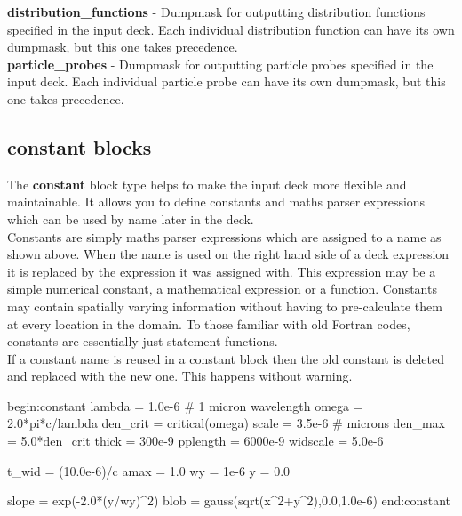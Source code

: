 \documentclass[12pt,a4paper]{article}
\newcommand{\emphtext}{\color{warwickdark} \fontfamily{phv}\selectfont\large\bf}
\newcommand{\inlineemph}[1]{{\color{warwicklight} \bf{#1}}}
\newenvironment{lboxverbatim}[1]{
\setlength{\FrameSep}{0pt}
\def\FrameCommand{\fboxsep=0pt \colorbox{shadecolor}}
\MakeFramed{\FrameRestore}
\vspace{-13.5pt}
\fvset{label=#1}
\boxverb
}{
\endboxverb
\vspace{-13.5pt}
\endMakeFramed
}
\begin{document}
{\emphtext distribution\_functions} - Dumpmask for outputting distribution
functions specified in the input deck. Each individual distribution function
can have its own dumpmask, but this one takes precedence.\\

{\emphtext particle\_probes} - Dumpmask for outputting particle probes
specified in the input deck. Each individual particle probe
can have its own dumpmask, but this one takes precedence.\\


\subsection{\inlineemph{constant} blocks}

The \inlineemph{constant} block type helps to make the input deck more flexible
and maintainable. It allows you to define constants and maths parser
expressions which can be used by name later in the deck.\\

Constants are simply maths parser expressions which are assigned to a name as
shown above. When the name is used on the right hand side of a deck expression
it is replaced by the expression it was assigned with. This expression may
be a simple numerical constant, a mathematical expression or a function.
Constants may contain spatially varying information without having to
pre-calculate them at every location in the domain.
To those familiar with old Fortran codes, constants are essentially just
statement functions.\\

If a constant name is reused in a constant block then the old constant is
deleted and replaced with the new one. This happens without warning.\\

\begin{lboxverbatim}{constant block}
begin:constant
   lambda = 1.0e-6 # 1 micron wavelength
   omega = 2.0*pi*c/lambda
   den_crit = critical(omega)
   scale = 3.5e-6 # microns
   den_max = 5.0*den_crit
   thick = 300e-9
   pplength = 6000e-9
   widscale = 5.0e-6

   t_wid = (10.0e-6)/c
   amax = 1.0
   wy = 1e-6
   y = 0.0

   slope = exp(-2.0*(y/wy)^2)
   blob = gauss(sqrt(x^2+y^2),0.0,1.0e-6)
end:constant
\end{lboxverbatim}
\end{document}
